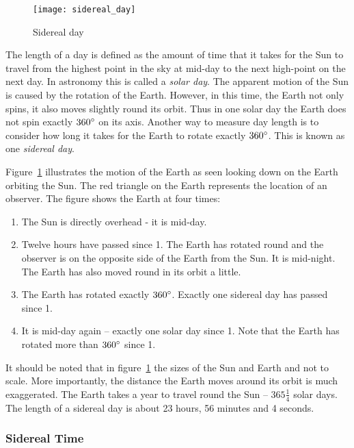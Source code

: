 \begin{figure}[ht]
\centering\texttt{[image: sidereal\_day]}
\caption{Sidereal day}
\label{fig:SiderealDay}
\end{figure}

The length of a day is defined as the amount of time that it takes for
the Sun to travel from the highest point in the sky at mid-day to the
next high-point on the next day. In astronomy this is called a
\emph{solar day}. The apparent motion of the Sun is caused by the
rotation of the Earth. However, in this time, the Earth not only spins,
it also moves slightly round its orbit. Thus in one solar day the Earth
does not spin exactly $360\degree$ on its axis. Another way to measure day
length is to consider how long it takes for the Earth to rotate exactly
$360\degree$. This is known as one \emph{sidereal day}.

Figure~\ref{fig:SiderealDay} illustrates the motion of the Earth as
seen looking down on the Earth orbiting the Sun. The red triangle on the
Earth represents the location of an observer. The figure shows the Earth
at four times:

\begin{enumerate}
\item
  The Sun is directly overhead - it is mid-day.
\item
  Twelve hours have passed since 1. The Earth has rotated round and the
  observer is on the opposite side of the Earth from the Sun. It is
  mid-night. The Earth has also moved round in its orbit a little.
\item
  The Earth has rotated exactly $360\degree$. Exactly one sidereal day has
  passed since 1.
\item
  It is mid-day again -- exactly one solar day since 1. Note that the
  Earth has rotated more than $360\degree$ since 1.
\end{enumerate}

It should be noted that in figure~\ref{fig:SiderealDay} the sizes of
the Sun and Earth and not to scale. More importantly, the distance the
Earth moves around its orbit is much exaggerated. The Earth takes a
year to travel round the Sun --
$365\frac{1}{4}$ solar days. The length of a
sidereal day is about 23 hours, 56 minutes and 4 seconds.

\subsubsection{Sidereal Time}
\label{sec:Concepts:SiderealTime}

